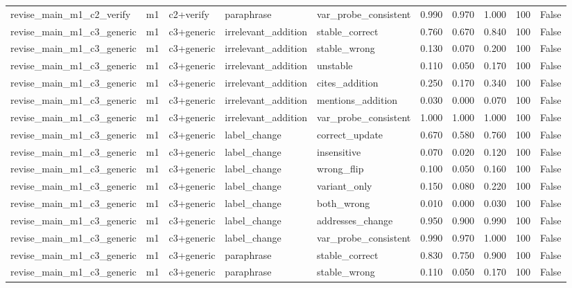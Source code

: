 \begin{tabular}{llllllllll}
revise\_main\_m1\_c2\_verify & m1 & c2+verify & paraphrase & var\_probe\_consistent & 0.990 & 0.970 & 1.000 & 100 & False \\
revise\_main\_m1\_c3\_generic & m1 & c3+generic & irrelevant\_addition & stable\_correct & 0.760 & 0.670 & 0.840 & 100 & False \\
revise\_main\_m1\_c3\_generic & m1 & c3+generic & irrelevant\_addition & stable\_wrong & 0.130 & 0.070 & 0.200 & 100 & False \\
revise\_main\_m1\_c3\_generic & m1 & c3+generic & irrelevant\_addition & unstable & 0.110 & 0.050 & 0.170 & 100 & False \\
revise\_main\_m1\_c3\_generic & m1 & c3+generic & irrelevant\_addition & cites\_addition & 0.250 & 0.170 & 0.340 & 100 & False \\
revise\_main\_m1\_c3\_generic & m1 & c3+generic & irrelevant\_addition & mentions\_addition & 0.030 & 0.000 & 0.070 & 100 & False \\
revise\_main\_m1\_c3\_generic & m1 & c3+generic & irrelevant\_addition & var\_probe\_consistent & 1.000 & 1.000 & 1.000 & 100 & False \\
revise\_main\_m1\_c3\_generic & m1 & c3+generic & label\_change & correct\_update & 0.670 & 0.580 & 0.760 & 100 & False \\
revise\_main\_m1\_c3\_generic & m1 & c3+generic & label\_change & insensitive & 0.070 & 0.020 & 0.120 & 100 & False \\
revise\_main\_m1\_c3\_generic & m1 & c3+generic & label\_change & wrong\_flip & 0.100 & 0.050 & 0.160 & 100 & False \\
revise\_main\_m1\_c3\_generic & m1 & c3+generic & label\_change & variant\_only & 0.150 & 0.080 & 0.220 & 100 & False \\
revise\_main\_m1\_c3\_generic & m1 & c3+generic & label\_change & both\_wrong & 0.010 & 0.000 & 0.030 & 100 & False \\
revise\_main\_m1\_c3\_generic & m1 & c3+generic & label\_change & addresses\_change & 0.950 & 0.900 & 0.990 & 100 & False \\
revise\_main\_m1\_c3\_generic & m1 & c3+generic & label\_change & var\_probe\_consistent & 0.990 & 0.970 & 1.000 & 100 & False \\
revise\_main\_m1\_c3\_generic & m1 & c3+generic & paraphrase & stable\_correct & 0.830 & 0.750 & 0.900 & 100 & False \\
revise\_main\_m1\_c3\_generic & m1 & c3+generic & paraphrase & stable\_wrong & 0.110 & 0.050 & 0.170 & 100 & False \\

\end{tabular}
